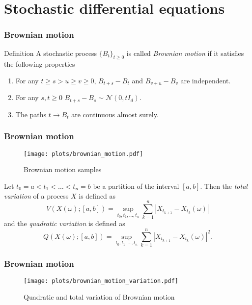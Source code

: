 \documentclass[17pt,institute=e10]{tuhh_presentation}
\begin{document}
\section{Stochastic differential equations}
\begin{frame}
  \frametitle{Brownian motion}
  \begin{block}{Definition \autocite{durrettProbabilityTheoryExamples2019}}
    A stochastic process $\{B_t\}_{t \geq 0}$ is called \emph{\textcolor{purple-pontifex}{Brownian motion}} if it satisfies the following properties
  \begin{enumerate}
    \item For any $t \geq s > u \geq v \geq 0$, $B_{t+s} - B_t$ and $B_{v+u} - B_v$ are independent.
    \item For any $s,t \geq 0$ $B_{t+s} - B_s \sim \mathcal{N}(0, tI_d)$.
    \item The paths $t \rightarrow B_t$ are continuous almost surely.
  \end{enumerate}
  \end{block}
\end{frame}
\begin{frame}[fragile]
  \frametitle{Brownian motion}
    \vspace{-1cm}
    \begin{figure}
      \centering
      \texttt{[image: plots/brownian\_motion.pdf]}
      \caption{Brownian motion samples}
    \end{figure}
\end{frame}
\begin{frame}[fragile]
  Let $t_0 = a < t_1 < \dots < t_n = b$ be a partition of the interval $[a,b]$. Then the \emph{\textcolor{purple-pontifex}{total variation}} of a process $X$ is defined as 
  \begin{equation*}
    V(X(\omega);[a,b]) = \sup_{t_0,t_1,\dots,t_n} \sum_{k=1}^n |X_{t_{k+1}} - X_{t_k}(\omega)|
  \end{equation*}
  and the \emph{\textcolor{purple-pontifex}{quadratic variation}} is defined as 
  \begin{equation*}
    Q(X(\omega);[a,b]) = \sup_{t_0,t_1,\dots,t_n} \sum_{k=1}^n |X_{t_{k+1}} - X_{t_k}(\omega)|^2.
  \end{equation*}
\end{frame}
\begin{frame}[fragile]
  \frametitle{Brownian motion}
    \vspace{-1cm}
    \begin{figure}
      \centering
      \texttt{[image: plots/brownian\_motion\_variation.pdf]}
      \caption{Quadratic and total variation of Brownian motion}
    \end{figure}
\end{frame}
\end{document}
